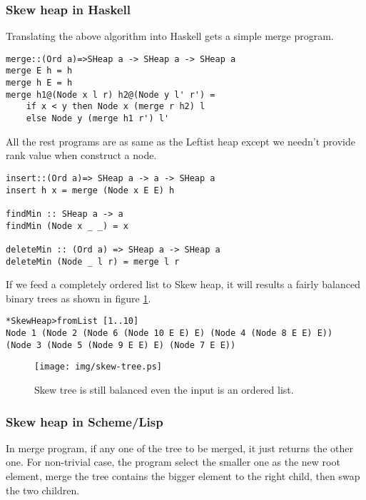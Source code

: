 \documentclass{article}
\begin{document}
\subsubsection*{Skew heap in Haskell}

Translating the above algorithm into Haskell gets a simple merge program.

\lstset{language=Haskell}
\begin{lstlisting}
merge::(Ord a)=>SHeap a -> SHeap a -> SHeap a
merge E h = h
merge h E = h
merge h1@(Node x l r) h2@(Node y l' r') = 
    if x < y then Node x (merge r h2) l
    else Node y (merge h1 r') l'
\end{lstlisting}

All the rest programs are as same as the Leftist heap except we needn't
provide rank value when construct a node. 

\begin{lstlisting}
insert::(Ord a)=> SHeap a -> a -> SHeap a
insert h x = merge (Node x E E) h

findMin :: SHeap a -> a
findMin (Node x _ _) = x

deleteMin :: (Ord a) => SHeap a -> SHeap a
deleteMin (Node _ l r) = merge l r
\end{lstlisting}

If we feed a completely ordered list to Skew heap, it will results a
fairly balanced binary trees as shown in figure \ref{fig:skew-tree}.

\begin{lstlisting}
*SkewHeap>fromList [1..10]
Node 1 (Node 2 (Node 6 (Node 10 E E) E) (Node 4 (Node 8 E E) E)) 
(Node 3 (Node 5 (Node 9 E E) E) (Node 7 E E))
\end{lstlisting}

\begin{figure}[htbp]
   \begin{center}
   	  \texttt{[image: img/skew-tree.ps]}
    \caption{Skew tree is still balanced even the input is an ordered list.} \label{fig:skew-tree}
   \end{center}
\end{figure}

\subsubsection*{Skew heap in Scheme/Lisp}

In merge program, if any one of the tree to be merged, it just returns the
other one. For non-trivial case, the program select the smaller one
as the new root element, merge the tree contains the bigger element
to the right child, then swap the two children.
\end{document}
